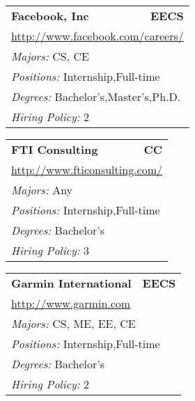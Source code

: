 \documentclass[twoside]{article}
\begin{document}
\begin{center}
\begin{multicols}{3}
\begin{FlushLeft}
\begin{minipage}{\columnwidth}
\end{minipage}
 
\begin{minipage}{\columnwidth}\begin{tabularx}{.95\columnwidth}{Xr}
                 {\Large\bf Facebook, Inc} & {\Large\bf EECS}\\
    \multicolumn{2}{p{.95\columnwidth}}{\url{http://www.facebook.com/careers/}}\\
    \multicolumn{2}{p{.95\columnwidth}}{\emph{Majors:} CS, CE}\\
    \multicolumn{2}{p{.95\columnwidth}}{\emph{Positions:} Internship,Full-time}\\
    \multicolumn{2}{p{.95\columnwidth}}{\emph{Degrees:} Bachelor's,Master's,Ph.D.}\\
    \multicolumn{2}{p{.95\columnwidth}}{\emph{Hiring Policy:} 2}\\
    \end{tabularx}
    
\end{minipage}
 
\begin{minipage}{\columnwidth}\begin{tabularx}{.95\columnwidth}{Xr}
                 {\Large\bf FTI Consulting} & {\Large\bf CC}\\
    \multicolumn{2}{p{.95\columnwidth}}{\url{http://www.fticonsulting.com/}}\\
    \multicolumn{2}{p{.95\columnwidth}}{\emph{Majors:} Any}\\
    \multicolumn{2}{p{.95\columnwidth}}{\emph{Positions:} Internship,Full-time}\\
    \multicolumn{2}{p{.95\columnwidth}}{\emph{Degrees:} Bachelor's}\\
    \multicolumn{2}{p{.95\columnwidth}}{\emph{Hiring Policy:} 3}\\
    \end{tabularx}
    
\end{minipage}
 
\begin{minipage}{\columnwidth}\begin{tabularx}{.95\columnwidth}{Xr}
                 {\Large\bf Garmin International} & {\Large\bf EECS}\\
    \multicolumn{2}{p{.95\columnwidth}}{\url{http://www.garmin.com}}\\
    \multicolumn{2}{p{.95\columnwidth}}{\emph{Majors:} CS, ME, EE, CE}\\
    \multicolumn{2}{p{.95\columnwidth}}{\emph{Positions:} Internship,Full-time}\\
    \multicolumn{2}{p{.95\columnwidth}}{\emph{Degrees:} Bachelor's}\\
    \multicolumn{2}{p{.95\columnwidth}}{\emph{Hiring Policy:} 2}\\
    \end{tabularx}
    

\end{minipage}
\end{FlushLeft}
\end{multicols}
\end{center}
\end{document}
